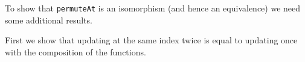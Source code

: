To show that \texttt{permuteAt} is an isomorphism (and hence an equivalence) we need
some additional results.

First we show that updating at the same index twice is equal to updating once with the
composition of the functions.

\begin{code}%
\>[0]\AgdaSpace{}%
\AgdaSymbol{:}%
\>[277I]\AgdaSpace{}%
\AgdaSymbol{\{}\AgdaSymbol{\}}\AgdaSpace{}%
\AgdaSymbol{\{}\AgdaSpace{}%
\AgdaSymbol{:}\AgdaSpace{}%
\AgdaSymbol{\}}\AgdaSpace{}%
\AgdaSymbol{(}\AgdaSpace{}%
\AgdaSymbol{:}\AgdaSpace{}%
\AgdaSpace{}%
\AgdaSpace{}%
\AgdaSymbol{)}\AgdaSpace{}%
\AgdaSymbol{(}\AgdaSpace{}%
\AgdaSymbol{:}\AgdaSpace{}%
\AgdaSpace{}%
\AgdaSpace{}%
\AgdaSymbol{)}\AgdaSpace{}%
\AgdaSymbol{(}\AgdaSpace{}%
\AgdaSymbol{:}\AgdaSpace{}%
\AgdaSpace{}%
\AgdaSymbol{)}\<%
\\
\>[.][@{}l@{}]\<[277I]%
\>[12]\AgdaSpace{}%
\AgdaSymbol{(}\AgdaSpace{}%
\AgdaOperator{\AgdaFunction{[}}\AgdaSpace{}%
\AgdaSpace{}%
\AgdaOperator{\AgdaFunction{]\%=}}\AgdaSpace{}%
\AgdaSpace{}%
\AgdaOperator{\AgdaFunction{[}}\AgdaSpace{}%
\AgdaSpace{}%
\AgdaOperator{\AgdaFunction{]\%=}}\AgdaSpace{}%
\AgdaSymbol{)}\AgdaSpace{}%
\AgdaSpace{}%
\AgdaSymbol{(}\AgdaSpace{}%
\AgdaOperator{\AgdaFunction{[}}\AgdaSpace{}%
\AgdaSpace{}%
\AgdaOperator{\AgdaFunction{]\%=}}\AgdaSpace{}%
\AgdaSpace{}%
\AgdaSpace{}%
\AgdaSymbol{)}\<%
\end{code}
\begin{code}[hide]%
\>[0]\AgdaSpace{}%
\AgdaSpace{}%
\AgdaSymbol{(}\AgdaSpace{}%
\AgdaSpace{}%
\AgdaSymbol{)}\AgdaSpace{}%
\AgdaSpace{}%
\AgdaSymbol{=}\AgdaSpace{}%
\<%
\\
\>[0]\AgdaSpace{}%
\AgdaSpace{}%
\AgdaSymbol{(}\AgdaSpace{}%
\AgdaSpace{}%
\AgdaSymbol{)}\AgdaSpace{}%
\AgdaSymbol{(}\AgdaSpace{}%
\AgdaSymbol{)}\AgdaSpace{}%
\AgdaSymbol{=}\AgdaSpace{}%
\AgdaSpace{}%
\AgdaSymbol{(}\AgdaSpace{}%
\AgdaSymbol{)}\AgdaSpace{}%
\AgdaSymbol{(}\AgdaSpace{}%
\AgdaSpace{}%
\AgdaSpace{}%
\AgdaSymbol{)}\<%
\end{code}
